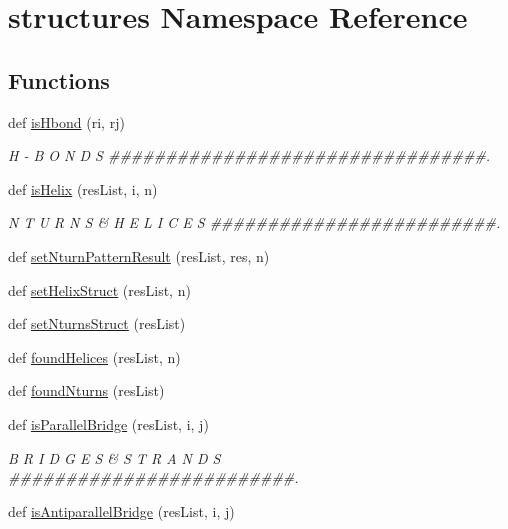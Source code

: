 \hypertarget{namespacestructures}{}\section{structures Namespace Reference}
\label{namespacestructures}
\subsection*{Functions}
\begin{DoxyCompactItemize}
\item 
def \hyperlink{namespacestructures_aa576adcabf417d4dfd322b5d51ec882d}{is\+Hbond} (ri, rj)
\begin{DoxyCompactList}\small\item\em H -\/ B O N D S \#\#\#\#\#\#\#\#\#\#\#\#\#\#\#\#\#\#\#\#\#\#\#\#\#\#\#\#\#\#\#\#\#. \end{DoxyCompactList}\item 
def \hyperlink{namespacestructures_a6e7168d4ee2a843f6c542b9a2be62de8}{is\+Helix} (res\+List, i, n)
\begin{DoxyCompactList}\small\item\em N T U R N S \& H E L I C E S \#\#\#\#\#\#\#\#\#\#\#\#\#\#\#\#\#\#\#\#\#\#\#\#\#. \end{DoxyCompactList}\item 
def \hyperlink{namespacestructures_a9515a253ddfcce61aec69e51b0f1724f}{set\+Nturn\+Pattern\+Result} (res\+List, res, n)
\item 
def \hyperlink{namespacestructures_a4e2befc32cf9e8825a361f4d2ff17a85}{set\+Helix\+Struct} (res\+List, n)
\item 
def \hyperlink{namespacestructures_a0a358ea8e3f30f480a6a6dfd7e020a2d}{set\+Nturns\+Struct} (res\+List)
\item 
def \hyperlink{namespacestructures_a9fb356db1094ae66a9880731f8b1de21}{found\+Helices} (res\+List, n)
\item 
def \hyperlink{namespacestructures_a795926583fcdcef561a4e8d6b7376a91}{found\+Nturns} (res\+List)
\item 
def \hyperlink{namespacestructures_ab64fc35a044e3333a6250842d5556a76}{is\+Parallel\+Bridge} (res\+List, i, j)
\begin{DoxyCompactList}\small\item\em B R I D G E S \& S T R A N D S \#\#\#\#\#\#\#\#\#\#\#\#\#\#\#\#\#\#\#\#\#\#\#\#\#. \end{DoxyCompactList}\item 
def \hyperlink{namespacestructures_a09c19e5e3eb8cc345f18e4f25bc92452}{is\+Antiparallel\+Bridge} (res\+List, i, j)

\end{DoxyCompactItemize}
